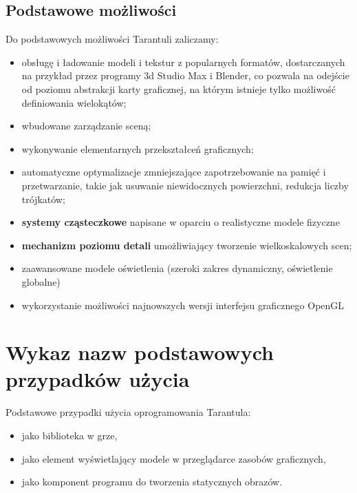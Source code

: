 \documentclass[11pt,leqno]{article}
\begin{document}
\subsection{Podstawowe możliwości}
\noindent
Do podstawowych możliwości Tarantuli zaliczamy:
\begin{itemize}
 \item obsługę i ładowanie modeli i tekstur z popularnych formatów, dostarczanych na przykład przez programy 3d Studio Max i Blender, co pozwala na odejście od poziomu abstrakcji karty graficznej, na którym istnieje tylko możliwość definiowania wielokątów;
  \item wbudowane zarządzanie sceną;
\item wykonywanie elementarnych przekształceń graficznych;
\item automatyczne optymalizacje zmniejszające zapotrzebowanie na pamięć i przetwarzanie, takie jak usuwanie niewidocznych powierzchni, redukcja liczby trójkatów;
\item {\bf systemy cząsteczkowe} napisane w oparciu o realistyczne modele fizyczne
\item {\bf mechanizm poziomu detali} umożliwiający tworzenie wielkoskalowych scen;
\item zaawansowane modele oświetlenia (szeroki zakres dynamiczny, oświetlenie globalne)
\item wykorzystanie możliwości najnowszych wersji interfejsu graficznego OpenGL
\end{itemize}


\section{Wykaz nazw podstawowych przypadków użycia}
Podstawowe przypadki użycia oprogramowania Tarantula:
\begin{itemize}
\item jako biblioteka w grze,
\item jako element wyświetlający modele w przeglądarce zasobów graficznych,
\item jako komponent programu do tworzenia statycznych obrazów.
\end{itemize}
\end{document}
